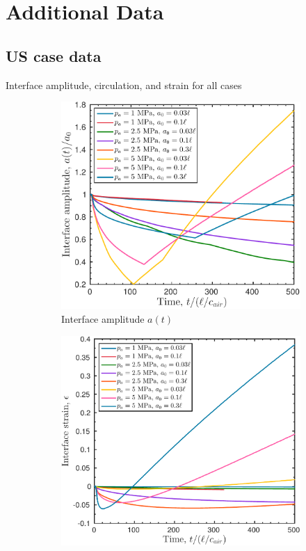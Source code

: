 \section{Additional Data}
\subsection{US case data}

Interface amplitude, circulation, and strain for all cases
\begin{figure}
  \begin{subfigure}{0.5\textwidth}
    \centering
    \includegraphics[width=\textwidth]{figs/appendix/rmawave_1_A10,25,50_a03,10,30_Interface_amplitude_02-Mar-2017}
    \caption{Interface amplitude $a(t)$}
  \end{subfigure}
  \begin{subfigure}{0.5\textwidth}
    \centering
    \includegraphics[width=\textwidth]{figs/appendix/rmawave_1_A10,25,50_a3,10,30_epsilon_02-Mar-2017}

\end{subfigure}
\end{figure}
